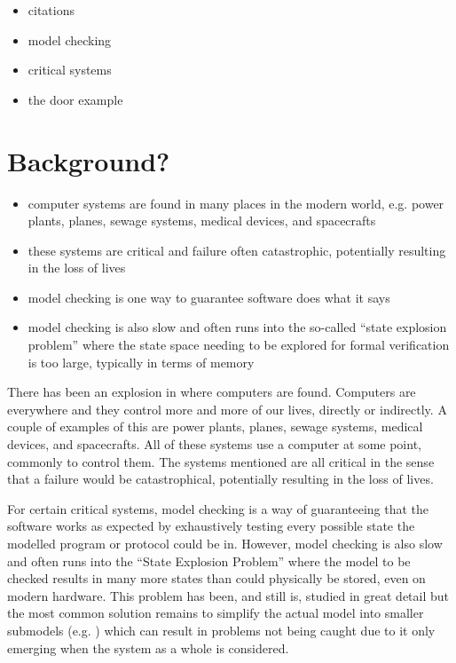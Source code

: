 \documentclass[11pt]{article}
\begin{document}
    \begin{itemize}
        \item citations
        \item model checking
        \item critical systems
        \item the door example
    \end{itemize}

    \section*{Background?}
    \begin{itemize}
        \item computer systems are found in many places in the modern world, e.g. power plants, planes, sewage systems, medical devices, and spacecrafts
        \item these systems are critical and failure often catastrophic, potentially resulting in the loss of lives
        \item model checking is one way to guarantee software does what it says
        \item model checking is also slow and often runs into the so-called ``state explosion problem'' where the state space needing to be explored for formal verification is too large, typically in terms of memory
    \end{itemize}

    There has been an explosion in where computers are found. Computers are everywhere and they control more and more of our lives, directly or indirectly. A couple of examples of this are power plants, planes, sewage systems, medical devices, and spacecrafts. All of these systems use a computer at some point, commonly to control them. The systems mentioned are all critical in the sense that a failure would be catastrophical, potentially resulting in the loss of lives.
    
    For certain critical systems, model checking is a way of guaranteeing that the software works as expected by exhaustively testing every possible state the modelled program or protocol could be in. However, model checking is also slow and often runs into the ``State Explosion Problem'' \cite{goos_state_1998} where the model to be checked results in many more states than could physically be stored, even on modern hardware. This problem has been, and still is, studied in great detail \cite{goos_progress_2001,stuart_simulation-verification_2001,demri_parametric_2006,clarke_model_2008,kress-gazit_correct_2011,meyer_model_2012} but the most common solution remains to simplify the actual model into smaller submodels (e.g. \cite{yan_sun_verifying_2007}) which can result in problems not being caught due to it only emerging when the system as a whole is considered.\\
    
\end{document}
